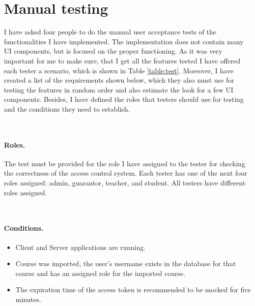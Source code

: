 \section{Manual testing} I have asked four people to do the manual user acceptance tests of the functionalities I have implemented. The implementation does not contain many UI components, but is focused on the proper functioning. As it was very important for me to make sure, that I get all the features tested I have offered each tester a scenario, which is shown in Table \ref{table:test}. Moreover, I have created a list of the requirements shown below, which they also must use for testing the features in random order and also estimate the look for a few UI components. Besides, I have defined the roles that testers should use for testing and the conditions they need to establish.  

\

\paragraph*{Roles.} The test must be provided for the role I have assigned to the tester for checking the correctness of the access control system. Each tester has one of the next four roles assigned: admin, guarantor, teacher, and student. All testers have different roles assigned.

\

\paragraph*{Conditions.} 
\begin{itemize}
    \item  Client and Server applications are running.
    \item  Course was imported, the user's username exists in the database for that course and has an assigned role for the imported course.
    \item  The expiration time of the access token is recommended to be mocked for five minutes.
\end{itemize}

\

